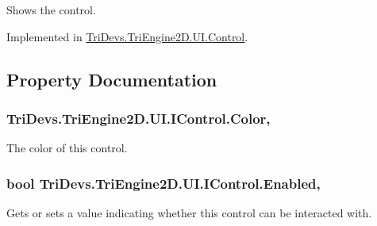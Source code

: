 Shows the control. 



Implemented in \hyperlink{class_tri_devs_1_1_tri_engine2_d_1_1_u_i_1_1_control_a5be351a3f27e9acf27542b83291c8651}{Tri\-Devs.\-Tri\-Engine2\-D.\-U\-I.\-Control}.



\subsection{Property Documentation}
\hypertarget{interface_tri_devs_1_1_tri_engine2_d_1_1_u_i_1_1_i_control_a335ed38fa9721a145ce551c1889bfc49}{
\subsubsection[{Color}]{ Tri\-Devs.\-Tri\-Engine2\-D.\-U\-I.\-I\-Control.\-Color\hspace{0.3cm}{\ttfamily [get]}, {\ttfamily [set]}}}\label{interface_tri_devs_1_1_tri_engine2_d_1_1_u_i_1_1_i_control_a335ed38fa9721a145ce551c1889bfc49}


The color of this control. 

\hypertarget{interface_tri_devs_1_1_tri_engine2_d_1_1_u_i_1_1_i_control_ac9ede42532a11e5b9257b349936cae61}{
\subsubsection[{Enabled}]{\setlength{\rightskip}{0pt plus 5cm}bool Tri\-Devs.\-Tri\-Engine2\-D.\-U\-I.\-I\-Control.\-Enabled\hspace{0.3cm}{\ttfamily [get]}, {\ttfamily [set]}}}\label{interface_tri_devs_1_1_tri_engine2_d_1_1_u_i_1_1_i_control_ac9ede42532a11e5b9257b349936cae61}


Gets or sets a value indicating whether this control can be interacted with. 

